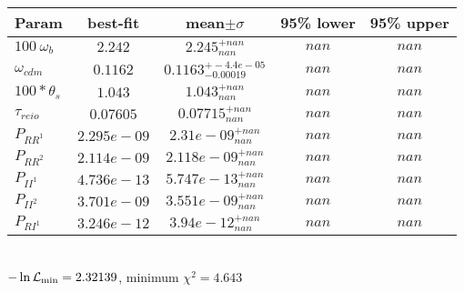 \begin{tabular}{|l|c|c|c|c|} 
 \hline 
Param & best-fit & mean$\pm\sigma$ & 95\% lower & 95\% upper \\ \hline 
$100~\omega_{b }$ &$2.242$ & $2.245_{nan}^{+nan}$ & $nan$ & $nan$ \\ 
$\omega_{cdm }$ &$0.1162$ & $0.1163_{-0.00019}^{+-4.4e-05}$ & $nan$ & $nan$ \\ 
$100*\theta_{s }$ &$1.043$ & $1.043_{nan}^{+nan}$ & $nan$ & $nan$ \\ 
$\tau_{reio }$ &$0.07605$ & $0.07715_{nan}^{+nan}$ & $nan$ & $nan$ \\ 
$P_{{RR}^1 }$ &$2.295e-09$ & $2.31e-09_{nan}^{+nan}$ & $nan$ & $nan$ \\ 
$P_{{RR}^2 }$ &$2.114e-09$ & $2.118e-09_{nan}^{+nan}$ & $nan$ & $nan$ \\ 
$P_{{II}^1 }$ &$4.736e-13$ & $5.747e-13_{nan}^{+nan}$ & $nan$ & $nan$ \\ 
$P_{{II}^2 }$ &$3.701e-09$ & $3.551e-09_{nan}^{+nan}$ & $nan$ & $nan$ \\ 
$P_{{RI}^1 }$ &$3.246e-12$ & $3.94e-12_{nan}^{+nan}$ & $nan$ & $nan$ \\ 
\hline 
 \end{tabular} \\ 
$-\ln{\cal L}_\mathrm{min} =2.32139$, minimum $\chi^2=4.643$ \\ 
